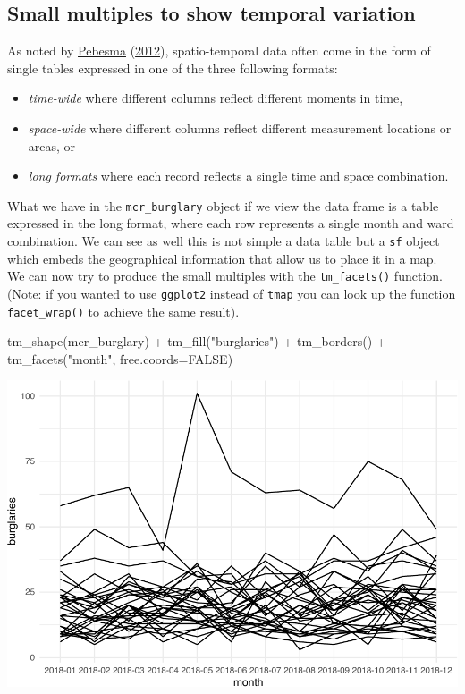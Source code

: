\documentclass[
  krantz2]{krantz}
\makeatletter
\newenvironment{Shaded}{\begin{snugshade}}{\end{snugshade}}
\newcommand{\AttributeTok}[1]{\textcolor[rgb]{0.61,0.61,0.61}{#1}}
\newcommand{\ConstantTok}[1]{\textcolor[rgb]{0,0,0}{#1}}
\newcommand{\FunctionTok}[1]{\textcolor[rgb]{0,0,0}{#1}}
\newcommand{\NormalTok}[1]{#1}
\newcommand{\SpecialCharTok}[1]{\textcolor[rgb]{0,0,0}{#1}}
\newcommand{\StringTok}[1]{\textcolor[rgb]{0.5,0.5,0.5}{#1}}
\providecommand{\tightlist}{%
  \setlength{\itemsep}{0pt}\setlength{\parskip}{0pt}}
\newenvironment{kframe}{%
\medskip{}
\setlength{\fboxsep}{.8em}
 \def\at@end@of@kframe{}%
 \ifinner\ifhmode%
  \def\at@end@of@kframe{\end{minipage}}%
  \begin{minipage}{\columnwidth}%
 \fi\fi%
 \def\FrameCommand##1{\hskip\@totalleftmargin \hskip-\fboxsep
 \colorbox{shadecolor}{##1}\hskip-\fboxsep
     \hskip-\linewidth \hskip-\@totalleftmargin \hskip\columnwidth}%
 \MakeFramed {\advance\hsize-\width
   \@totalleftmargin\z@ \linewidth\hsize
   \@setminipage}}%
 {\par\unskip\endMakeFramed%
 \at@end@of@kframe}
\renewenvironment{Shaded}{\begin{kframe}}{\end{kframe}}
\makeatother
\begin{document}
\hypertarget{small-multiples-to-show-temporal-variation}{%
\subsection{Small multiples to show temporal variation}\label{small-multiples-to-show-temporal-variation}}

As noted by \protect\hyperlink{ref-Pebesma_2012}{Pebesma} (\protect\hyperlink{ref-Pebesma_2012}{2012}), spatio-temporal data often come in the form of single tables expressed in one of the three following formats:

\begin{itemize}
\tightlist
\item
  \emph{time-wide} where different columns reflect different moments in time,
\item
  \emph{space-wide} where different columns reflect different measurement locations or areas, or
\item
  \emph{long formats} where each record reflects a single time and space combination.
\end{itemize}

What we have in the \texttt{mcr\_burglary} object if we view the data frame is a table expressed in the long format, where each row represents a single month and ward combination. We can see as well this is not simple a data table but a \texttt{sf} object which embeds the geographical information that allow us to place it in a map. We can now try to produce the small multiples with the \texttt{tm\_facets()} function. (Note: if you wanted to use \texttt{ggplot2} instead of \texttt{tmap} you can look up the function \texttt{facet\_wrap()} to achieve the same result).

\begin{Shaded}
\begin{Highlighting}[]
\FunctionTok{tm\_shape}\NormalTok{(mcr\_burglary) }\SpecialCharTok{+} 
  \FunctionTok{tm\_fill}\NormalTok{(}\StringTok{"burglaries"}\NormalTok{) }\SpecialCharTok{+}
  \FunctionTok{tm\_borders}\NormalTok{() }\SpecialCharTok{+}
  \FunctionTok{tm\_facets}\NormalTok{(}\StringTok{"month"}\NormalTok{, }\AttributeTok{free.coords=}\ConstantTok{FALSE}\NormalTok{)}
\end{Highlighting}
\end{Shaded}

\includegraphics{crime_mapping_files/figure-latex/unnamed-chunk-181-1.pdf}
\end{document}
